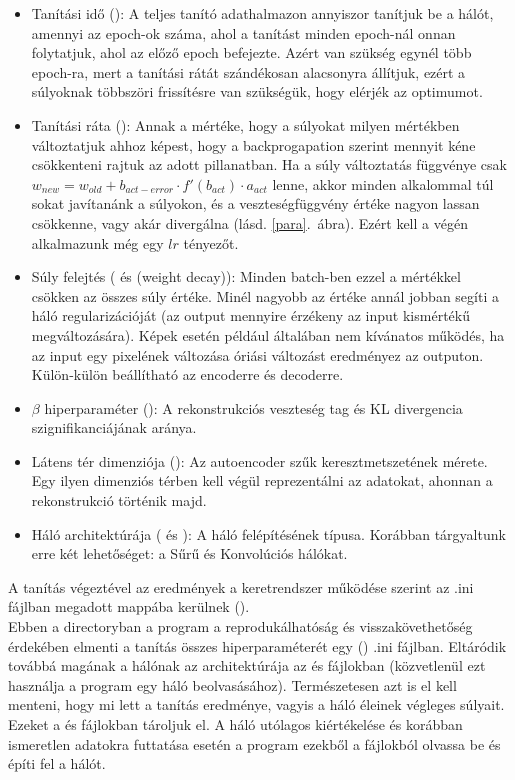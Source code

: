 \begin{itemize}
  \item Tanítási idő (): A teljes tanító adathalmazon annyiszor tanítjuk be a hálót, amennyi az epoch-ok száma, ahol a tanítást minden epoch-nál onnan folytatjuk, ahol az előző epoch befejezte. Azért van szükség egynél több epoch-ra, mert a tanítási rátát szándékosan alacsonyra állítjuk, ezért a súlyoknak többszöri frissítésre van szükségük, hogy elérjék az optimumot.
  \item Tanítási ráta (): Annak a mértéke, hogy a súlyokat milyen mértékben változtatjuk ahhoz képest, hogy a backprogapation szerint mennyit kéne csökkenteni rajtuk az adott pillanatban. Ha a súly változtatás függvénye csak $w_{new} =  w_{old} + b_{act-error} \cdot f'(b_{act}) \cdot a_{act}$ lenne, akkor minden alkalommal túl sokat javítanánk a súlyokon, és a veszteségfüggvény értéke nagyon lassan csökkenne, vagy akár divergálna (lásd. \ref{para}.~ábra). Ezért kell a végén alkalmazunk még egy $lr$ tényezőt.
  \item Súly felejtés ( és  (weight decay)): Minden batch-ben ezzel a mértékkel csökken az összes súly értéke. Minél nagyobb az értéke annál jobban segíti a háló regularizációját (az output mennyire érzékeny az input kismértékű megváltozására). Képek esetén például általában nem kívánatos működés, ha az input egy pixelének változása óriási változást eredményez az outputon. Külön-külön beállítható az encoderre és decoderre.
  \item $\beta$ hiperparaméter  (): A rekonstrukciós veszteség tag és KL divergencia szignifikanciájának aránya.
  \item Látens tér dimenziója (): Az autoencoder szűk keresztmetszetének mérete. Egy ilyen dimenziós térben kell végül reprezentálni az adatokat, ahonnan a rekonstrukció történik majd.
  \item Háló architektúrája ( és ): A háló felépítésének típusa. Korábban tárgyaltunk erre két lehetőséget: a Sűrű és Konvolúciós hálókat.
\end{itemize}

A tanítás végeztével az eredmények a keretrendszer működése szerint az .ini fájlban megadott  mappába kerülnek ().\\ Ebben a directoryban a program a reprodukálhatóság és visszakövethetőség érdekében elmenti a tanítás összes hiperparaméterét egy () .ini fájlban. Eltáródik továbbá magának a hálónak az architektúrája az  és  fájlokban (közvetlenül ezt használja a program egy háló beolvasásához). Természetesen azt is el kell menteni, hogy mi lett a tanítás eredménye, vagyis a háló éleinek végleges súlyait. Ezeket a  és  fájlokban tároljuk el. A háló utólagos kiértékelése és korábban ismeretlen adatokra futtatása esetén a program ezekből a fájlokból olvassa be és építi fel a hálót.

